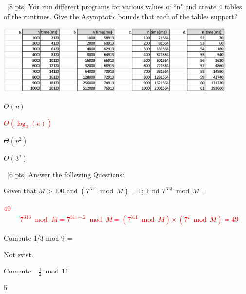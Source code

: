 \documentclass[12pt]{article}
\newenvironment{sol}[1][Solution]{\begin{trivlist}\item[\hskip\labelsep {\bfseries #1:}]}{\end{trivlist}}
\begin{document}
\begin{enumerate}
    \item \ [8 pts] You run different programs for various values of ``n" and create 4 tables of the runtimes. Give the Asymptotic bounds that each of the tables support?
            \begin{center}
        \includegraphics[width=0.9\textwidth]{p2.png}.
    \end{center}
    \begin{sol}
    \hspace*{\fill}
    \begin{enumerate}
        \item $\Theta(n)$
        \textcolor{red}{ \item $\Theta(\log_2(n))$}
        \item $\Theta(n^2)$
        \item $\Theta(3^n)$
    \end{enumerate}
    \end{sol}


    \item \ [6 pts] Answer the following Questions:
    \begin{enumerate}
        \item Given that $M > 100$ and $(7^{311} \bmod M ) = 1$; Find $7^{313} \bmod M =$ 
        \begin{sol}
            \textcolor{red}{49
            \begin{align*}
                & 7^{313} \bmod M = 7^{311+2} \bmod M = (7^{311} \bmod M) \times (7^2 \bmod M) = 49
            \end{align*}
            }
        \end{sol}
        \item Compute 1/3 mod 9 = 
        \begin{sol}
            Not exist.
        \end{sol}
        \item Compute $-\frac{1}{2} \bmod 11$
        \begin{sol}
        5
        \end{sol}
    \end{enumerate}


\end{enumerate}
\end{document}
